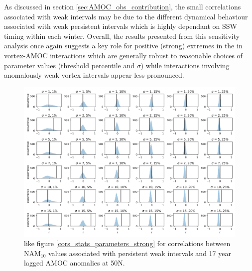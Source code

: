 As discussed in section \ref{sec:AMOC_obs_contribution}, the small correlations associated with weak intervals may be due to the different dynamical behaviour associated with weak persistent intervals which is highly dependant on SSW timing within each winter. Overall, the results presented from this sensitivity analysis once again suggests a key role for positive (strong) extremes in the in vortex-AMOC interactions which are generally robust to reasonable choices of parameter values (threshold percentile and $\sigma$) while interactions involving anomalously weak vortex intervals appear less pronounced. 

\newpage
\begin{landscape}
\begin{figure}[h!]
\begin{center}
\noindent\includegraphics[width =0.9\linewidth]{Figures/Figures-surface/cors_sigs_thresh_and_sigma_weak.png} 
\caption[PDFs for correlations between the magnitude of weak NAM$_{10}$ extreme and lagged AMOC for different $\sigma$ and threshold]{like figure \ref{cors_stats_parameters_strong} for correlations between NAM$_{10}$ values associated with persistent weak intervals and 17 year lagged AMOC anomalies at 50N.}
\label{cors_stats_parameters_weak}
\end{center}
\end{figure}
\end{landscape}


